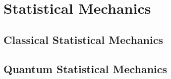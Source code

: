 \section{Statistical Mechanics} 

\subsection{Classical Statistical Mechanics}

\subsection{Quantum Statistical Mechanics} 